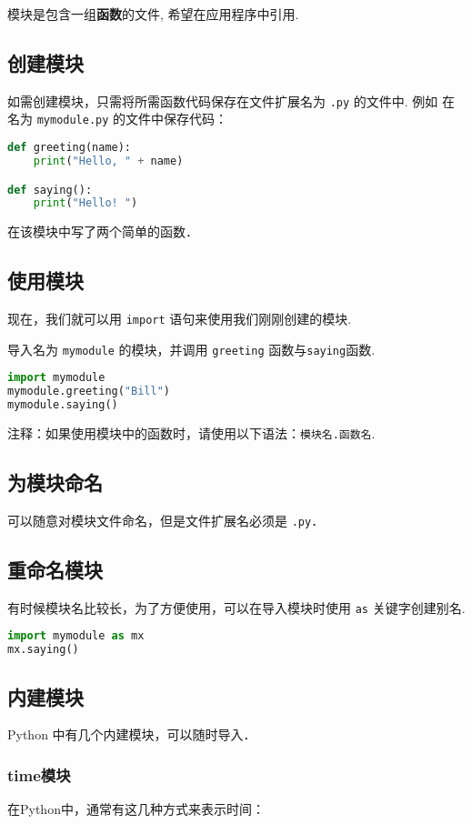 
模块是包含一组\textbf{函数}的文件, 希望在应用程序中引用.
\subsection{创建模块}
如需创建模块，只需将所需函数代码保存在文件扩展名为 \verb|.py| 的文件中. 例如
在名为 \verb|mymodule.py| 的文件中保存代码：
\begin{lstlisting}[language=python]
def greeting(name):
    print("Hello, " + name)

def saying():
    print("Hello! ")
\end{lstlisting}
在该模块中写了两个简单的函数．

\subsection{使用模块}
现在，我们就可以用 \verb|import| 语句来使用我们刚刚创建的模块.

导入名为 \verb|mymodule| 的模块，并调用 \verb|greeting| 函数与\verb|saying|函数.
\begin{lstlisting}[language=python]
import mymodule
mymodule.greeting("Bill")
mymodule.saying()
\end{lstlisting}
注释：如果使用模块中的函数时，请使用以下语法：\verb|模块名.函数名|.

\subsection{为模块命名}
可以随意对模块文件命名，但是文件扩展名必须是 \verb|.py|．

\subsection{重命名模块}
有时候模块名比较长，为了方便使用，可以在导入模块时使用 \verb|as| 关键字创建别名.
\begin{lstlisting}[language=python]
import mymodule as mx
mx.saying()
\end{lstlisting}

\subsection{内建模块}
Python 中有几个内建模块，可以随时导入．
\subsubsection{time模块}
在Python中，通常有这几种方式来表示时间：


